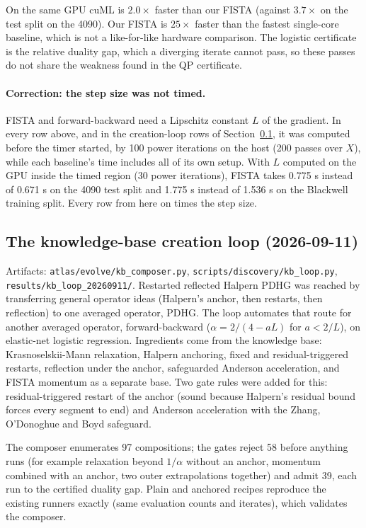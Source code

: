 On the same GPU cuML is $2.0\times$ faster than our FISTA (against $3.7\times$ on
the test split on the 4090). Our FISTA is $25\times$ faster than the fastest
single-core baseline, which is not a like-for-like hardware comparison. The
logistic certificate is the relative duality gap, which a diverging iterate
cannot pass, so these passes do not share the weakness found in the QP
certificate.

\paragraph{Correction: the step size was not timed.}
FISTA and forward-backward need a Lipschitz constant $L$ of the gradient. In
every row above, and in the creation-loop rows of
Section~\ref{app:log:kbloop}, it was computed before the timer started, by 100
power iterations on the host (200 passes over $X$), while each baseline's time
includes all of its own setup. With $L$ computed on the GPU inside the timed
region (30 power iterations), FISTA takes 0.775 s instead of 0.671 s on the
4090 test split and 1.775 s instead of 1.536 s on the Blackwell training split.
Every row from here on times the step size.

\subsection{The knowledge-base creation loop (2026-09-11)}
\label{app:log:kbloop}

Artifacts: \texttt{atlas/evolve/kb\_composer.py}, \texttt{scripts/discovery/kb\_loop.py},
\texttt{results/kb\_loop\_20260911/}. Restarted reflected Halpern PDHG was reached
by transferring general operator ideas (Halpern's anchor, then restarts, then
reflection) to one averaged operator, PDHG. The loop automates that route for
another averaged operator, forward-backward ($\alpha = 2/(4-aL)$ for $a<2/L$),
on elastic-net logistic regression. Ingredients come from the knowledge base:
Krasnoselskii-Mann relaxation, Halpern anchoring, fixed and residual-triggered
restarts, reflection under the anchor, safeguarded Anderson acceleration, and
FISTA momentum as a separate base. Two gate rules were added for this:
residual-triggered restart of the anchor (sound because Halpern's residual
bound forces every segment to end) and Anderson acceleration with the
Zhang, O'Donoghue and Boyd safeguard.

The composer enumerates 97 compositions; the gates reject 58 before anything
runs (for example relaxation beyond $1/\alpha$ without an anchor, momentum
combined with an anchor, two outer extrapolations together) and admit 39,
each run to the certified duality gap. Plain and anchored recipes reproduce
the existing runners exactly (same evaluation counts and iterates), which
validates the composer.

